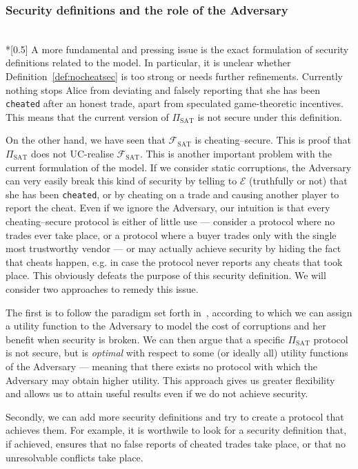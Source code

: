 \subsubsection{Security definitions and the role of the Adversary} \ \\*[0.5\baselineskip]
  A more fundamental and pressing issue is the exact formulation of security definitions
  related to the model. In particular, it is unclear whether
  Definition~\ref{def:nocheatsec} is too strong or needs further refinements. Currently
  nothing stops Alice from deviating and falsely reporting that she has been
  \texttt{cheated} after an honest trade, apart from speculated game-theoretic incentives.
  This means that the current version of $\Pi_{\mathrm{SAT}}$ is not secure under this
  definition.

  On the other hand, we have seen that $\mathcal{F}_{\mathrm{SAT}}$ is cheating--secure.
  This is proof that $\Pi_{\mathrm{SAT}}$ does not UC-realise
  $\mathcal{F}_{\mathrm{SAT}}$. This is another important problem with the current
  formulation of the model. If we consider static corruptions, the Adversary can very
  easily break this kind of security by telling to $\mathcal{E}$ (truthfully or not) that
  she has been \texttt{cheated}, or by cheating on a trade and causing another player to
  report the cheat. Even if we ignore the Adversary, our intuition is that every
  cheating--secure protocol is either of little use --- consider a protocol where no
  trades ever take place, or a protocol where a buyer trades only with the single most
  trustworthy vendor --- or may actually achieve security by hiding the fact that cheats
  happen, e.g. in case the protocol never reports any cheats that took place. This
  obviously defeats the purpose of this security definition. We will consider two
  approaches to remedy this issue.

  The first is to follow the paradigm set forth in~\cite{rationalprotocol}, according to
  which we can assign a utility function to the Adversary to model the cost of corruptions
  and her benefit when security is broken. We can then argue that a specific
  $\Pi_{\mathrm{SAT}}$ protocol is not secure, but is \textit{optimal} with respect to
  some (or ideally all) utility functions of the Adversary --- meaning that there exists
  no protocol with which the Adversary may obtain higher utility. This approach gives us
  greater flexibility and allows us to attain useful results even if we do not achieve
  security.

  Secondly, we can add more security definitions and try to create a protocol that
  achieves them. For example, it is worthwile to look for a security definition that, if
  achieved, ensures that no false reports of cheated trades take place, or that no
  unresolvable conflicts take place.

